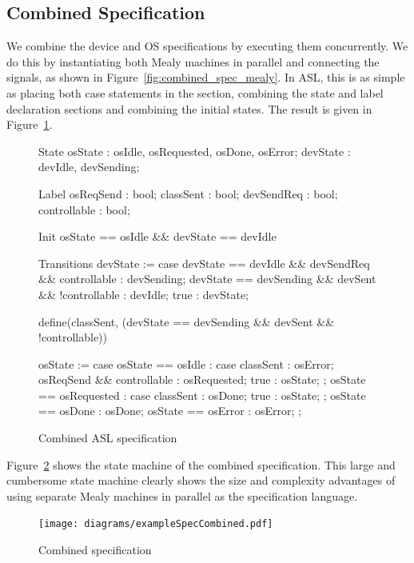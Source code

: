 \subsection{Combined Specification}

We combine the device and OS specifications by executing them concurrently. We do this by instantiating both Mealy machines in parallel and connecting the signals, as shown in Figure~\ref{fig:combined_spec_mealy}. In ASL, this is as simple as placing both case statements in the  section, combining the state and label declaration sections and combining the initial states. The result is given in Figure~\ref{fig:combined_spec_asl}.

\begin{figure}
\centering
\begin{asllisting}
State
osState  : {osIdle, osRequested, osDone, osError};
devState : {devIdle, devSending};

Label
osReqSend    : bool;
classSent    : bool;
devSendReq   : bool;
controllable : bool;

Init
osState == osIdle && devState == devIdle

Transitions
devState := case {
    devState == devIdle && devSendReq && controllable  : devSending;
    devState == devSending && devSent && !controllable : devIdle;
    true                                               : devState;
}

define(classSent, (devState == devSending && devSent && !controllable)) 

osState := case {
    osState == osIdle :
        case {
            classSent                 : osError;
            osReqSend && controllable : osRequested;
            true                      : osState;
        };
    osState == osRequested :
        case {
            classSent : osDone; 
            true      : osState;
        };
    osState == osDone  : osDone;
    osState == osError : osError;
};
 
\end{asllisting}
\caption{Combined ASL specification}
\label{fig:combined_spec_asl}
\end{figure}

Figure~\ref{fig:combined_spec} shows the state machine of the combined specification. This large and cumbersome state machine clearly shows the size and complexity advantages of using separate Mealy machines in parallel as the specification language.

\begin{figure}
\centering
\texttt{[image: diagrams/exampleSpecCombined.pdf]}
\caption{Combined specification}
\label{fig:combined_spec}
\end{figure}

